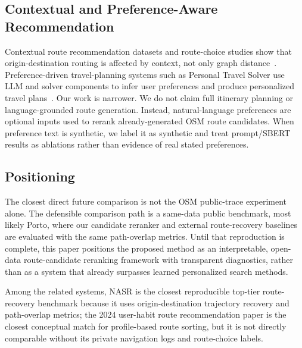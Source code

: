 \subsection{Contextual and Preference-Aware Recommendation}
Contextual route recommendation datasets and route-choice studies show that origin-destination routing is affected by context, not only graph distance~\cite{contexttrails2025}. Preference-driven travel-planning systems such as Personal Travel Solver use LLM and solver components to infer user preferences and produce personalized travel plans~\cite{wang2025pts}. Our work is narrower. We do not claim full itinerary planning or language-grounded route generation. Instead, natural-language preferences are optional inputs used to rerank already-generated OSM route candidates. When preference text is synthetic, we label it as synthetic and treat prompt/SBERT results as ablations rather than evidence of real stated preferences.

\subsection{Positioning}
The closest direct future comparison is not the OSM public-trace experiment alone. The defensible comparison path is a same-data public benchmark, most likely Porto, where our candidate reranker and external route-recovery baselines are evaluated with the same path-overlap metrics. Until that reproduction is complete, this paper positions the proposed method as an interpretable, open-data route-candidate reranking framework with transparent diagnostics, rather than as a system that already surpasses learned personalized search methods.

Among the related systems, NASR is the closest reproducible top-tier route-recovery benchmark because it uses origin-destination trajectory recovery and path-overlap metrics; the 2024 user-habit route recommendation paper is the closest conceptual match for profile-based route sorting, but it is not directly comparable without its private navigation logs and route-choice labels.

